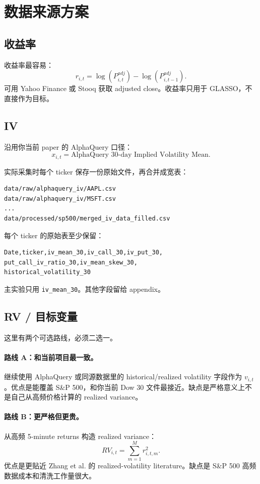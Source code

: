 \documentclass[11pt,a4paper]{ctexart}
\begin{document}
\section{数据来源方案}

\subsection{收益率}

收益率最容易：
\[
r_{i,t}=\log(P_{i,t}^{adj})-\log(P_{i,t-1}^{adj}).
\]
可用 Yahoo Finance 或 Stooq 获取 adjusted close。收益率只用于 GLASSO，不直接作为目标。

\subsection{IV}

沿用你当前 paper 的 AlphaQuery 口径：
\[
x_{i,t}= \text{AlphaQuery 30-day Implied Volatility Mean}.
\]

实际采集时每个 ticker 保存一份原始文件，再合并成宽表：

\begin{lstlisting}
data/raw/alphaquery_iv/AAPL.csv
data/raw/alphaquery_iv/MSFT.csv
...
data/processed/sp500/merged_iv_data_filled.csv
\end{lstlisting}

每个 ticker 的原始表至少保留：

\begin{lstlisting}
Date,ticker,iv_mean_30,iv_call_30,iv_put_30,
put_call_iv_ratio_30,iv_mean_skew_30,
historical_volatility_30
\end{lstlisting}

主实验只用 \texttt{iv\_mean\_30}。其他字段留给 appendix。

\subsection{RV / 目标变量}

这里有两个可选路线，必须二选一。

\paragraph{路线 A：和当前项目最一致。}
继续使用 AlphaQuery 或同源数据里的 historical/realized volatility 字段作为 \(v_{i,t}\)。优点是能覆盖 S\&P 500，和你当前 Dow 30 文件最接近。缺点是严格意义上不是自己从高频价格计算的 realized variance。

\paragraph{路线 B：更严格但更贵。}
从高频 5-minute returns 构造 realized variance：
\[
RV_{i,t}=\sum_{m=1}^{M} r_{i,t,m}^{2}.
\]
优点是更贴近 Zhang et al. 的 realized-volatility literature。缺点是 S\&P 500 高频数据成本和清洗工作量很大。
\end{document}
